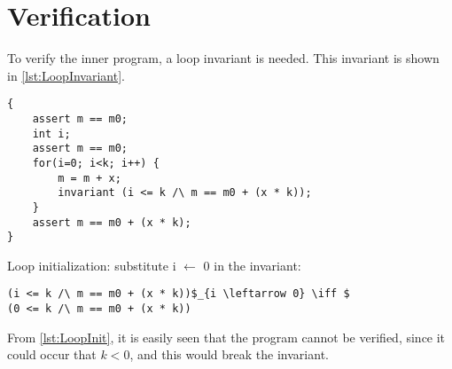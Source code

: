 \documentclass[Main_Assignment4]{subfiles}
\begin{document}
\section{Verification}
To verify the inner program, a loop invariant is needed. 
This invariant is shown in \codeTitle \ref{lst:LoopInvariant}. 

\begin{lstlisting}[mathescape, caption=Loop invariant, style=Code-C++, label=lst:LoopInvariant]
{
	assert m == m0;
	int i;
	assert m == m0;
	for(i=0; i<k; i++) {
		m = m + x;
		invariant (i <= k /\ m == m0 + (x * k));
	}
	assert m == m0 + (x * k);
}
\end{lstlisting}


Loop initialization: substitute i $\leftarrow$ 0 in the invariant:
\begin{lstlisting}[mathescape, caption=Loop initialization, style=Code-C++, label=lst:LoopInit]
(i <= k /\ m == m0 + (x * k))$_{i \leftarrow 0} \iff $ 
(0 <= k /\ m == m0 + (x * k))  
\end{lstlisting}

From \codeTitle \ref{lst:LoopInit}, it is easily seen that the program cannot be verified, since it could occur that $k < 0$, and this would break the invariant.
\end{document}
